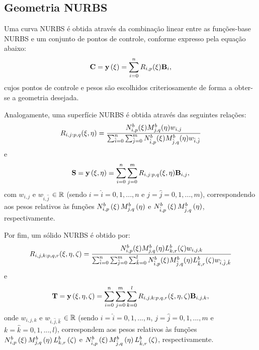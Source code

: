 \subsection{Geometria NURBS}

Uma curva NURBS é obtida através da combinação linear entre as funções-base NURBS e um conjunto de pontos de controle, conforme expresso pela equação abaixo: 
\begin{align}
\mathbf{C} = \mathbf{y}\left(\xi\right) = \sum_{i=0}^{n}R_{i,p}(\xi)\mathbf{B}_i, \label{eq:curveNURBS}
\end{align}
\noindent cujos pontos de controle e pesos são escolhidos criteriosamente de forma a obter-se a geometria desejada.

Analogamente, uma superfície NURBS é obtida através das seguintes relações:
\begin{align}
R_{i,j:p,q}(\xi,\eta) = \frac{N^b_{i,p}(\xi)M^b_{j,q}(\eta)w_{i,j}}{\sum_{\hat{i}=0}^{n}\sum_{\hat{j}=0}^{m}N^b_{\hat{i},p}(\xi)M^b_{\hat{j},q}(\eta)w_{\hat{i},\hat{j}}}
\end{align}
\noindent e
\begin{align}
\mathbf{S} = \mathbf{y}\left(\xi,\eta\right) = \sum_{i=0}^{n}\sum_{j=0}^{m}R_{i,j:p,q}(\xi,\eta)\mathbf{B}_{i,j}, \label{eq:surfaceNURBS}
\end{align}
\noindent com $w_{i,j}$ e $w_{\hat{i},\hat{j}}$ $\in \mathbb{R}$ (sendo $i = \hat{i} =  0, 1, ... , n$ e  $j = \hat{j} =  0, 1, ... , m$), correspondendo aos pesos relativos às funções $N^b_{i,p}\left(\xi\right)M^b_{j,q}\left(\eta\right)$ e $N^b_{\hat{i},p}\left(\xi\right)M^b_{\hat{j},q}\left(\eta\right)$, respectivamente.

Por fim, um sólido NURBS é obtido por:
\begin{align}
R_{i,j,k:p,q,r}(\xi,\eta,\zeta) = \frac{N^b_{i,p}(\xi)M^b_{j,q}(\eta)L^b_{k,r}(\zeta)w_{i,j,k}}
{\sum_{\hat{i}=0}^{n}\sum_{\hat{j}=0}^{m}\sum_{\hat{k}=0}^{l}N^b_{\hat{i},p}(\xi)M^b_{\hat{j},q}(\eta)L^b_{\hat{k},r}(\zeta)w_{\hat{i},\hat{j},\hat{k}}}
\end{align}
\noindent e
\begin{align}
\mathbf{T} = \mathbf{y}\left(\xi,\eta,\zeta\right) = \sum_{i=0}^{n}\sum_{j=0}^{m}\sum_{k=0}^{l}R_{i,j,k:p,q,r}(\xi,\eta,\zeta)\mathbf{B}_{i,j,k}, \label{eq:solidNURBS}
\end{align}
\noindent onde $w_{i,j,k}$ e $w_{\hat{i},\hat{j},\hat{k}}$ $\in \mathbb{R}$ (sendo $i = \hat{i} =  0, 1, ... , n$, $j = \hat{j} =  0, 1, ... , m$ e $k = \hat{k} =  0, 1, ... , l$), correspondem aos pesos relativos às funções $N^b_{i,p}\left(\xi\right)M^b_{j,q}\left(\eta\right)L^b_{k,r}\left(\zeta\right)$ e $N^b_{\hat{i},p}\left(\xi\right)M^b_{\hat{j},q}\left(\eta\right)L^b_{\hat{k},r}\left(\zeta\right)$, respectivamente.

